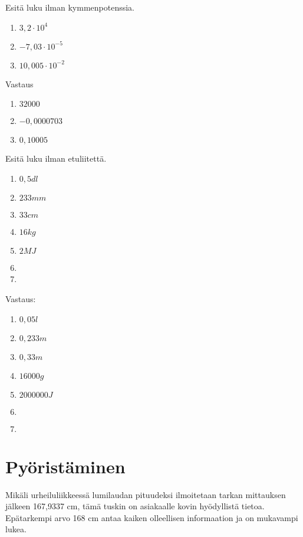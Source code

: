 \begin{tehtava}
Esitä luku ilman kymmenpotenssia.
\begin{enumerate}
\item $3,2 \cdot 10^4$
\item $-7,03 \cdot 10^{-5}$
\item $10,005 \cdot 10^{-2}$
\end{enumerate}
\begin{vastaus}
Vastaus
\begin{enumerate}
\item $32000$
\item $-0,0000703$
\item $0,10005$
\end{enumerate}
\end{vastaus}
\end{tehtava}

\begin{tehtava}
Esitä luku ilman etuliitettä.
\begin{enumerate}
\item $0,5 dl$
\item $233 mm$
\item $33 cm$
\item $16 kg$
\item $2 MJ$
\item %
\item
\end{enumerate}
\begin{vastaus}
Vastaus:
\begin{enumerate}
\item $0,05 l$
\item $0,233 m$
\item $0,33 m$
\item $16 000 g$
\item $2 000 000 J$
\item $ $
\item $ $
\end{enumerate}
\end{vastaus}
\end{tehtava}

\section*{Pyöristäminen}

Mikäli urheiluliikkeessä lumilaudan pituudeksi ilmoitetaan tarkan mittauksen jälkeen 167,9337 cm, tämä tuskin on asiakaalle kovin hyödyllistä tietoa. Epätarkempi arvo 168 cm antaa kaiken olleellisen informaation ja on mukavampi lukea.

